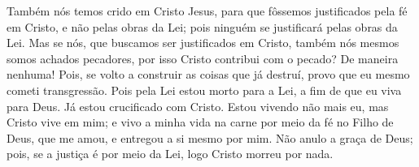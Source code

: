 {{} Também nós temos crido em Cristo Jesus, para que fôssemos justificados pela fé em Cristo,
 e não pelas obras da Lei; pois ninguém
 se justificará pelas obras da Lei.
  Mas se nós, que buscamos ser justificados em Cristo, também nós mesmos somos achados pecadores, por isso Cristo contribui com o pecado?
 De maneira nenhuma!
  Pois, se volto a construir as coisas que já destruí, provo que eu mesmo cometi transgressão.
  Pois pela Lei estou morto para a Lei, a fim de que eu viva para Deus.
  Já estou crucificado com Cristo. Estou vivendo não mais eu, mas Cristo vive em mim; e vivo a minha vida na carne por meio da fé no Filho de Deus,
 que me amou, e entregou a si mesmo por mim.
  Não anulo a graça
 de Deus; pois, se a justiça
 é por meio da Lei, logo Cristo morreu por nada.
\par }

